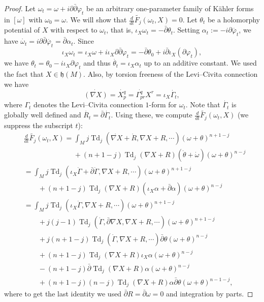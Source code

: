 \documentclass[10pt,a4paper]{amsart}
\DeclareMathOperator{\Td}{Td}
\def\a{\alpha}
\def\bp{\bar\partial}
\def\p{\partial}
\begin{document}
\begin{proof}
Let $\omega_t=\omega+i\p\bp \varphi_t$ be an arbitrary one-parameter family of K\"ahler forms in $[\omega]$ with $\omega_0=\omega$. We will show that $\frac{d}{dt}\widetilde{F_j}(\omega_t,X)=0$. Let $\theta_t$ be a holomorphy potential of $X$ with respect to $\omega_t$, that is, $\iota_X \omega_t = -\bp \theta_t$. Setting $\a_t:=-i\p\dot{\varphi_t}$, we have $\dot{\omega_t}=i\p\bp\dot{\varphi_t}=\bp \a_t$.
Since 
\begin{equation*}
\iota_X \omega_t=\iota_X \omega + i\iota_X\p\bp\varphi_t=-\bp\theta_0+i\bp\iota_X (\p\varphi_t), 
\end{equation*}
we have $\theta_t=\theta_0-i\iota_X \p\varphi_t$ and thus $\dot{\theta_t}=\iota_X \a_t$ up to an additive constant.
We used the fact that $X\in\mathfrak{h}(M)$. Also, by torsion freeness of the Levi–Civita connection we have
\begin{equation*}
\dot{\left(\nabla X \right)}=\dot{X^q_p}=\dot{\Gamma^{q}_{pr}}X^r= \iota_X \dot{\Gamma_t},
\end{equation*}
where $\Gamma_t$ denotes the Levi–Civita connection $1$-form for $\omega_t$. Note that $\dot{\Gamma_t}$ is globally well defined and $\dot{R_t}=\bp\dot{\Gamma_t}$. Using these, we compute $\frac{d}{dt}\widetilde{F_j}(\omega_t,X)$ (we suppress the subscript $t$):  
\begin{align}\label{5}
&\frac{d}{dt}\widetilde{F_j}(\omega_t,X)=\int_M j\Td_j (\dot{\nabla X}+\dot{R}, \nabla X + R,\cdots)(\omega+\theta)^{n+1-j}\nonumber\\
&\qquad\qquad\qquad\quad+(n+1-j)\Td_j(\nabla X + R)(\dot{\theta}+\dot{\omega})(\omega+\theta)^{n-j} \nonumber\\
&=\int_M j\Td_j (\iota_X \dot{\Gamma}+\bp\dot{\Gamma}, \nabla X + R,\cdots)(\omega+\theta)^{n+1-j} \nonumber \\
&\qquad +(n+1-j)\Td_j(\nabla X + R)(\iota_X \a+\bp \a)(\omega+\theta)^{n-j}\nonumber\\
&=\int_M j\Td_j (\iota_X \dot{\Gamma}, \nabla X + R,\cdots)(\omega+\theta)^{n+1-j} \nonumber\\
&\qquad+j(j-1)\Td_j (\dot{\Gamma}, \bp\nabla X,\nabla X + R,\cdots)(\omega+\theta)^{n+1-j} \nonumber\\
&\qquad +j(n+1-j)\Td_j (\dot{\Gamma},\nabla X + R,\cdots)\bp\theta(\omega+\theta)^{n-j} \nonumber\\
&\qquad +(n+1-j)\Td_j(\nabla X + R)\iota_X \a (\omega+\theta)^{n-j} \nonumber\\
&\qquad -(n+1-j)\bp\Td_j(\nabla X + R) \a (\omega+\theta)^{n-j} \nonumber\\
&\qquad +(n+1-j)(n-j)\Td_j(\nabla X + R) \a \bp\theta(\omega+\theta)^{n-1-j},
\end{align}
where to get the last identity we used $\bp R=\bp\omega=0$ and integration by parts.


\end{proof}
\end{document}
